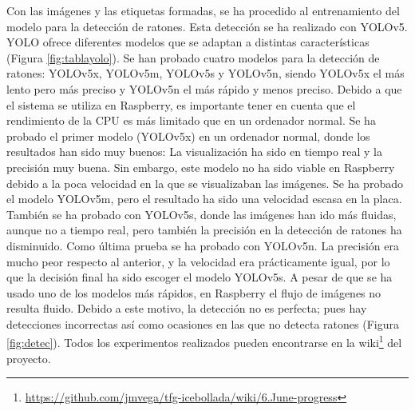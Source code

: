 Con las imágenes y las etiquetas formadas, se ha procedido al entrenamiento del modelo para la detección de ratones. Esta detección se ha realizado con YOLOv5. YOLO ofrece diferentes modelos que se adaptan a distintas características (Figura \ref{fig:tablayolo}). Se han probado cuatro modelos para la detección de ratones: YOLOv5x, YOLOv5m, YOLOv5s y YOLOv5n, siendo YOLOv5x el más lento pero más preciso y YOLOv5n el más rápido y menos preciso. Debido a que el sistema se utiliza en Raspberry, es importante tener en cuenta que el rendimiento de la CPU es más limitado que en un ordenador normal. Se ha probado el primer modelo (YOLOv5x) en un ordenador normal, donde los resultados han sido muy buenos: La visualización ha sido en tiempo real y la precisión muy buena. Sin embargo, este modelo no ha sido viable en Raspberry debido a la poca velocidad en la que se visualizaban las imágenes. Se ha probado el modelo YOLOv5m, pero el resultado ha sido una velocidad escasa en la placa. También se ha probado con YOLOv5s, donde las imágenes han ido más fluidas, aunque no a tiempo real, pero también la precisión en la detección de ratones ha disminuido. Como última prueba se ha probado con YOLOv5n. La precisión era mucho peor respecto al anterior, y la velocidad era prácticamente igual, por lo que la decisión final ha sido escoger el modelo YOLOv5s. A pesar de que se ha usado uno de los modelos más rápidos, en Raspberry el flujo de imágenes no resulta fluido. Debido a este motivo, la detección no es perfecta; pues hay detecciones incorrectas así como ocasiones en las que no detecta ratones (Figura \ref{fig:detec}). Todos los experimentos realizados pueden encontrarse en la wiki\footnote{\url{https://github.com/jmvega/tfg-icebollada/wiki/6.June-progress}} del proyecto.\\
